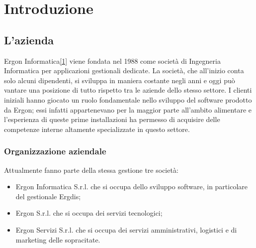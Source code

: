
\chapter{Introduzione}
\label{cap:introduzione}

\section{L'azienda}

Ergon Informatica\hyperref[sec:ergon]{[1]} viene fondata nel 1988 come società di Ingegneria Informatica per applicazioni gestionali dedicate.
La società, che all'inizio conta solo alcuni dipendenti, si sviluppa in maniera costante negli anni e oggi può vantare una posizione di tutto rispetto tra le aziende dello stesso settore.
I clienti iniziali hanno giocato un ruolo fondamentale nello sviluppo del software prodotto da Ergon; essi infatti appartenevano per la maggior parte all'ambito alimentare e l'esperienza di queste prime installazioni ha permesso di acquisire delle competenze interne altamente specializzate in questo settore.
\subsection{Organizzazione aziendale}
Attualmente fanno parte della stessa gestione tre società:

\begin{itemize}
\item Ergon Informatica S.r.l. che si occupa dello sviluppo software, in particolare del gestionale Ergdis;
\item Ergon S.r.l. che si occupa dei servizi tecnologici;
\item Ergon Servizi S.r.l. che si occupa dei servizi amministrativi, logistici e di marketing delle sopracitate.
\end{itemize}
\newpage
